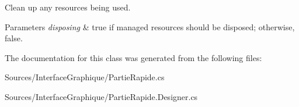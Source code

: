 Clean up any resources being used. 


\begin{DoxyParams}{Parameters}
{\em disposing} & true if managed resources should be disposed; otherwise, false.\\
\hline
\end{DoxyParams}


The documentation for this class was generated from the following files\+:\begin{DoxyCompactItemize}
\item 
Sources/\+Interface\+Graphique/Partie\+Rapide.\+cs\item 
Sources/\+Interface\+Graphique/Partie\+Rapide.\+Designer.\+cs\end{DoxyCompactItemize}
